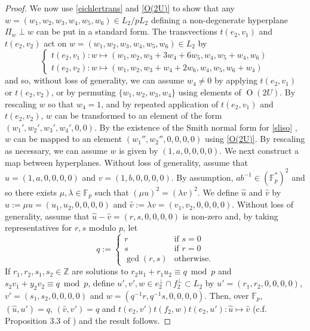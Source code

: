 \documentclass[11pt]{article}
\newcommand{\ZZ}{\mathbb{Z}}
\newcommand{\FF}{\mathbb{F}}
\newcommand{\opn}{\operatorname}
\begin{document}
\begin{proof}
We now use \eqref{eichlertrans} and \eqref{O(2U)} to show that any $w = (w_1, w_2, w_3, w_4, w_5, w_6) \in L_2 / p L_2$  defining a non-degenerate hyperplane $\Pi_w \perp w$ can be put in a standard form.
The transvections $t(e_2, v_1)$ and $t(e_2, v_2)$ act on $w = (w_1, w_2, w_3, w_4, w_5, w_6) \in L_2$ by
\begin{equation*}
\begin{cases}
t(e_2, v_1): w \mapsto (w_1, w_2, w_3 + 3w_4 + 6w_5, w_4, w_5 + w_4, w_6  ) \\
t(e_2, v_2): w \mapsto (w_1, w_2, w_3 + w_4 + 2w_6, w_4, w_5, w_6 + w_4)
\end{cases}
\end{equation*}
and so, without loss of generality, we can assume $w_4 \neq 0$ by applying $t(e_2,v_1)$ or $t(e_2, v_2)$, or by permuting $\{w_1, w_2, w_3, w_4 \}$ using  elements of $\opn{O}(2U)$.
By rescaling $w$ so that $w_4 = 1$, and by
repeated application of $t(e_2, v_1)$ and $t(e_2, v_2)$,
$w$ can be transformed to an element of the form
$(w_1',w_2',w_3',w_4', 0, 0)$.
By the existence of the Smith normal form for \eqref{sliso}
\cite{Newman}, $w$ can be mapped to an element $(w_1'', w_2'', 0,0,0,0)$ using \eqref{O(2U)}.
By rescaling as necessary, we can assume $w$ is given by $(1, a, 0,0,0,0)$.
We next construct a map between hyperplanes.
Without loss of generality, assume that $u=(1, a, 0,0,0,0)$ and $v=(1, b, 0,0,0,0)$. By assumption, $ab^{-1} \in (\FF_p^*)^2$ and so there exists $\mu, \lambda \in \FF_p$ such that $(\mu u)^2 = (\lambda v)^2$.
We define $\hat{u}$ and $\hat{v}$ by $\hat{u}:=\mu u = (u_1, u_2, 0,0,0,0)$ and   $\hat{v}:=\lambda v = (v_1, v_2, 0,0,0,0)$.
Without loss of generality, assume that $\hat{u} - \hat{v} = (r,s,0,0,0,0)$ is non-zero and, by taking  representatives for $r,s$ modulo $p$, let
\begin{equation*}
q :=
\begin{cases}
r & \text{if $s=0$}\\
s & \text{if $r=0$} \\
\opn{gcd}(r,s) & \text{otherwise}.
\end{cases}
\end{equation*}
If $r_1, r_2, s_1, s_2 \in \ZZ$ are solutions to
$r_2 u_1 + r_1 u_2 \equiv q \bmod{ p}$ and
$s_2 v_1 + y_2 v_2 \equiv q \bmod{ p}$,
define
$u', v', w \in e_2^{\perp} \cap f_2^{\perp} \subset L_2$
by $u'=(r_1, r_2, 0,0,0,0)$,
$v'=(s_1, s_2, 0,0,0,0)$ and
$w=(q^{-1}r, q^{-1}s, 0,0,0,0)$.
Then, over $\FF_p$,
$(\hat{u}, u') = q$, $(\hat{v}, v') = q$ and
$t(e_2, v')t(f_2, w)t(e_2, u'): \hat{u} \mapsto \hat{v}$ (c.f. Proposition 3.3 of \cite{abelianisation}) and the result follows.
\end{proof}
\end{document}
